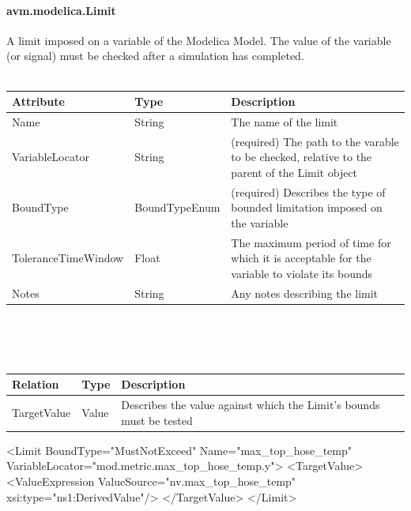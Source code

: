 \paragraph{avm.modelica.Limit}
A limit imposed on a variable of the Modelica Model. The value of the variable (or signal) must be checked after a simulation has completed.
\\ \\
\begin{tabular}{ l l p{9cm} }
\textbf{Attribute} & \textbf{Type} & \textbf{Description} \\ \hline
Name & String & The name of the limit \\ \hline
VariableLocator & String & (required) The path to the varable to be checked, relative to the parent of the Limit object \\ \hline
BoundType & BoundTypeEnum & (required) Describes the type of bounded limitation imposed on the variable \\ \hline
ToleranceTimeWindow & Float & The maximum period of time for which it is acceptable for the variable to violate its bounds \\ \hline
Notes & String & Any notes describing the limit \\ \hline
\end{tabular}
\\ \\ \\
\begin{tabular}{ l l p{9cm} }
\textbf{Relation} & \textbf{Type} & \textbf{Description} \\ \hline
TargetValue &Value & Describes the value against which the Limit's bounds must be tested \\ \hline
\end{tabular}

\begin{MyVerbatim}
    <Limit 
      BoundType="MustNotExceed" 
      Name="max_top_hose_temp" 
      VariableLocator="mod.metric.max_top_hose_temp.y">
      <TargetValue>
        <ValueExpression ValueSource="nv.max_top_hose_temp" 
           xsi:type="ns1:DerivedValue"/>
      </TargetValue>
    </Limit>
\end{MyVerbatim}

